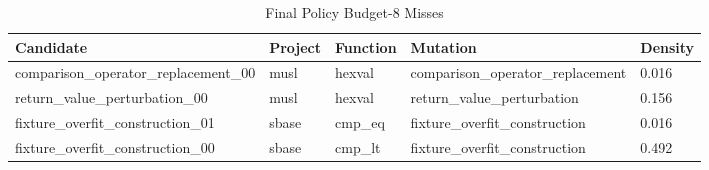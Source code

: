 \begin{table}[t]
\centering
\small
\begin{tabular}{lllll}
\toprule
Candidate & Project & Function & Mutation & Density \\
\midrule
comparison\_operator\_replacement\_00 & musl & hexval & comparison\_operator\_replacement & 0.016 \\
return\_value\_perturbation\_00 & musl & hexval & return\_value\_perturbation & 0.156 \\
fixture\_overfit\_construction\_01 & sbase & cmp\_eq & fixture\_overfit\_construction & 0.016 \\
fixture\_overfit\_construction\_00 & sbase & cmp\_lt & fixture\_overfit\_construction & 0.492 \\
\bottomrule
\end{tabular}
\caption{Final Policy Budget-8 Misses}
\end{table}

